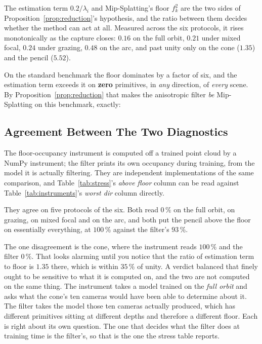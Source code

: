 The estimation term $0.2/\lambda_i$ and Mip-Splatting's floor $f_k^2$ are the two
sides of Proposition~\ref{prop:reduction}'s hypothesis, and the ratio between
them decides whether the method can act at all. Measured across the six
protocols, it rises monotonically as the capture closes: $0.16$ on the full
orbit, $0.21$ under mixed focal, $0.24$ under grazing, $0.48$ on the arc, and
past unity only on the cone ($1.35$) and the pencil ($5.52$).

On the standard benchmark the floor dominates by a factor of six, and the
estimation term exceeds it on \textbf{zero} primitives, in \emph{any} direction,
of \emph{every} scene. By Proposition~\ref{prop:reduction} that makes the anisotropic filter \emph{be} Mip-Splatting on this benchmark, exactly:


\subsection*{Agreement Between The Two Diagnostics}

The floor-occupancy instrument is computed off a trained point cloud by a NumPy instrument; the filter
prints its own occupancy during training, from the model it is actually
filtering. They are independent implementations of the same comparison, and
Table~\ref{tab:stress}'s \emph{above floor} column can be read against
Table~\ref{tab:instruments}'s \emph{worst dir} column directly.

They agree on five protocols of the six. Both read $0\,\%$ on the full orbit,
on grazing, on mixed focal and on the arc, and both put the pencil above the
floor on essentially everything, at $100\,\%$ against the filter's $93\,\%$.

The one disagreement is the cone, where the instrument reads $100\,\%$ and the
filter $0\,\%$. That looks alarming until you notice that the ratio of
estimation term to floor is $1.35$ there, which is within $35\,\%$ of unity. A
verdict balanced that finely ought to be sensitive to what it is computed on, and the two are not computed on the same thing. The instrument
takes a model trained on the \emph{full orbit} and asks what the cone's ten
cameras would have been able to determine about it. The filter takes the model
those ten cameras actually produced, which has different primitives sitting at
different depths and therefore a different floor. Each is right about its own
question. The one that decides what the filter does at training time is the filter's, so that is the one the stress table reports.

